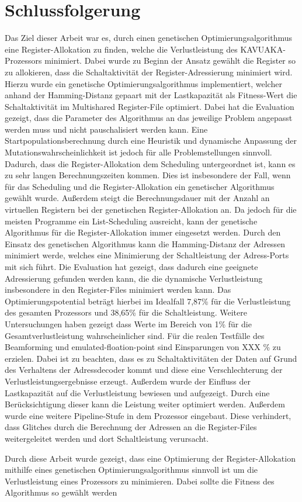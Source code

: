 \chapter{Schlussfolgerung}
\label{chap:schlussfolgerung}
Das Ziel dieser Arbeit war es, durch einen genetischen Optimierungsalgorithmus eine Register-Allokation zu finden, welche die Verlustleistung des KAVUAKA-Prozessors minimiert. Dabei wurde zu Beginn der Ansatz gewählt die Register so zu allokieren, dass die Schaltaktivität der Register-Adressierung minimiert wird. Hierzu wurde ein genetische Optimierungsalgorithmus implementiert, welcher anhand der Hamming-Distanz gepaart mit der Lastkapazität als Fitness-Wert die Schaltaktivität im Multishared Register-File optimiert. Dabei hat die Evaluation gezeigt, dass die Parameter des Algorithmus an das jeweilige Problem angepasst werden muss und nicht pauschalisiert werden kann. Eine Startpopulationsberechnung durch eine Heuristik und dynamische Anpassung der Mutationswahrscheinlichkeit ist jedoch für alle Problemstellungen sinnvoll.
Dadurch, dass die Register-Allokation dem Scheduling untergeordnet ist, kann es zu sehr langen Berechnungszeiten kommen. Dies ist insbesondere der Fall, wenn für das Scheduling und die Register-Allokation ein genetischer Algorithmus gewählt wurde. Außerdem steigt die Berechnungsdauer mit der Anzahl an virtuellen Registern bei der genetischen Register-Allokation an. Da jedoch für die meisten Programme ein List-Scheduling ausreicht, kann der genetische Algorithmus für die Register-Allokation immer eingesetzt werden.
Durch den Einsatz des genetischen Algorithmus kann die Hamming-Distanz der Adressen minimiert werde, welches eine Minimierung der Schaltleistung der Adress-Ports mit sich führt.  
Die Evaluation hat gezeigt, dass dadurch eine geeignete Adressierung gefunden werden kann, die die dynamische Verlustleistung insbesondere in den Register-Files minimiert werden kann. Das Optimierungspotential beträgt hierbei im Idealfall 7,87\% für die Verlustleistung des gesamten Prozessors und 38,65\% für die Schaltleistung.  Weitere Untersuchungen haben gezeigt dass Werte im Bereich von 1\% für die Gesamtverlustleistung wahrscheinlicher sind. Für die realen Testfälle des Beamforming und emulated-floation-point sind Einsparungen von XXX \% zu erzielen. Dabei ist zu beachten, dass es zu Schaltaktivitäten der Daten auf Grund des Verhaltens der Adressdecoder kommt und diese eine Verschlechterung der Verlustleistungsergebnisse erzeugt. Außerdem wurde der Einfluss der Lastkapazität auf die Verlustleistung bewiesen und aufgezeigt. Durch eine Berücksichtigung dieser kann die Leistung weiter optimiert werden.
Außerdem wurde eine weitere Pipeline-Stufe in dem Prozessor eingebaut. Diese verhindert, dass Glitches durch die Berechnung der Adressen an die Register-Files weitergeleitet werden und dort Schaltleistung verursacht.


Durch diese Arbeit wurde gezeigt, dass eine Optimierung der Register-Allokation mithilfe eines genetischen Optimierungsalgorithmus sinnvoll ist um die Verlustleistung eines Prozessors zu minimieren. Dabei sollte die Fitness des Algorithmus so gewählt werden 


